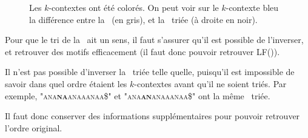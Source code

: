 \begin{figure}[h!]
\caption{Les $k$-contextes ont été colorés. On peut voir sur le $k$-contexte bleu la différence entre la \kbwt\ (en gris), et la \kbwt\ triée (à droite en noir).}
\label{tri}
\end{figure}


Pour que le tri de la \kbwt\ ait un sens, il faut s'assurer qu'il est possible de l'inverser, et retrouver des motifs efficacement (il faut donc pouvoir retrouver LF()).

Il n'est pas possible d'inverser la \kbwt\ triée telle quelle, puisqu'il est impossible de savoir dans quel ordre étaient les $k$-contextes avant qu'il ne soient triés. Par exemple, \textsc{"ana\textbf{na}anaaanaa\$"} et \textsc{"ana\textbf{an}anaaanaa\$"} ont la même \kbwt\ triée.

Il faut donc conserver des informations supplémentaires pour pouvoir retrouver l'ordre original.

